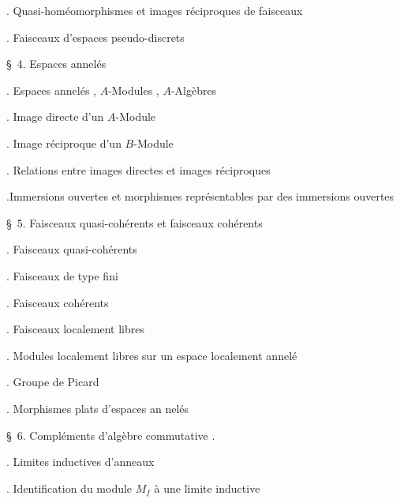 
\noindent{}. Quasi-homéomorphismes et images réciproques de faisceaux\dotfill

\noindent{}. Faisceaux d'espaces pseudo-discrets\dotfill

\noindent\quad \S\ 4. Espaces annelés\dotfill

\noindent{}. Espaces annelés , $A$-Modules , $A$-Algèbres\dotfill

\noindent{}. Image directe d'un $A$-Module\dotfill

\noindent{}. Image réciproque d'un $B$-Module\dotfill

\noindent{}. Relations entre images directes et images réciproques\dotfill

\noindent{}.Immersions ouvertes et morphismes représentables par des immersions ouvertes \dotfill

\noindent\quad \S\ 5. Faisceaux quasi-cohérents et faisceaux cohérents\dotfill

\noindent{}. Faisceaux quasi-cohérents\dotfill

\noindent{}. Faisceaux de type fini\dotfill

\noindent{}. Faisceaux cohérents\dotfill

\noindent{}. Faisceaux localement libres\dotfill

\noindent{}. Modules localement libres sur un espace localement annelé\dotfill

\noindent{}. Groupe de Picard\dotfill

\noindent{}. Morphismes plats d'espaces an%
%
nelés\dotfill

\noindent\quad \S\ 6. Compléments d'algèbre commutative .

\noindent{}. Limites inductives d'anneaux\dotfill

\noindent{}. Identification du module $M_f$ à une limite  inductive\dotfill

